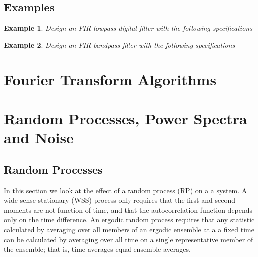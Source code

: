 \documentclass[11pt]{book}
\theoremstyle{example}
\newtheorem{example}{Example}[section]
\begin{document}
\subsection{Examples}

\begin{example}
	Design an FIR lowpass digital filter with the following specifications
\end{example}

\begin{example}
	Design an FIR bandpass filter with the following specifications
\end{example}

\section{Fourier Transform Algorithms}

\section{Random Processes, Power Spectra and Noise}

\subsection{Random Processes}

In this section we look at the effect of a random process (RP) on a a system. A wide-sense stationary (WSS) process only requires that the first and second moments are not function of time, and that the autocorrelation function depends only on the time difference. An ergodic random process requires that any statistic calculated by averaging over all members of an ergodic ensemble at a a fixed time can be calculated by averaging over all time on a single representative member of the ensemble; that is, time averages equal ensemble averages.
\end{document}
